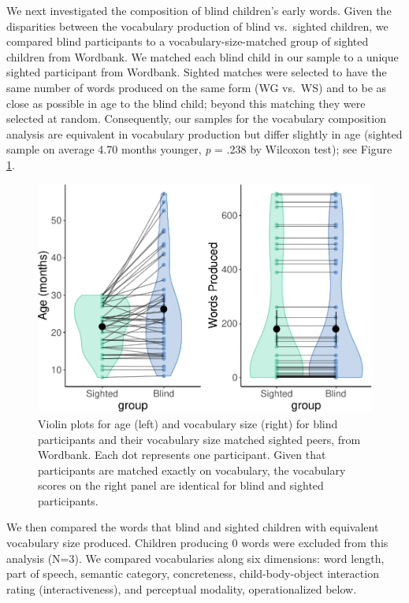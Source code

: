 \documentclass[
  man,floatsintext]{apa6}
\begin{document}
We next investigated the composition of blind children's early words. Given the disparities between the vocabulary production of blind vs.~sighted children, we compared blind participants to a vocabulary-size-matched group of sighted children from Wordbank. We matched each blind child in our sample to a unique sighted participant from Wordbank. Sighted matches were selected to have the same number of words produced on the same form (WG vs.~WS) and to be as close as possible in age to the blind child; beyond this matching they were selected at random. Consequently, our samples for the vocabulary composition analysis are equivalent in vocabulary production but differ slightly in age (sighted sample on average 4.70 months younger, \emph{p} = .238 by Wilcoxon test); see Figure \ref{fig:vocab-match-demo}.

\begin{figure}
\centering
\includegraphics{VI_CDI_manuscript_files/figure-latex/vocab-match-demo-1.pdf}
\caption{\label{fig:vocab-match-demo}Violin plots for age (left) and vocabulary size (right) for blind participants and their vocabulary size matched sighted peers, from Wordbank. Each dot represents one participant. Given that participants are matched exactly on vocabulary, the vocabulary scores on the right panel are identical for blind and sighted participants.}
\end{figure}

We then compared the words that blind and sighted children with equivalent vocabulary size produced. Children producing 0 words were excluded from this analysis (N=3). We compared vocabularies along six dimensions: word length, part of speech, semantic category, concreteness, child-body-object interaction rating (interactiveness), and perceptual modality, operationalized below.
\end{document}
